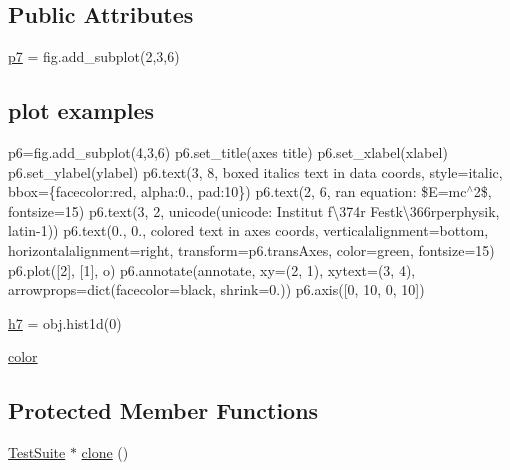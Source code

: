 \subsection*{Public Attributes}
\begin{DoxyCompactItemize}
\item 
\hyperlink{classTestSuite_a33f823770703efeb508f2736f4ef4e1b}{p7} = fig.\+add\+\_\+subplot(2,3,6)
\begin{DoxyCompactList}\small\item\em \subsection*{plot examples}

p6=fig.\+add\+\_\+subplot(4,3,6) p6.\+set\+\_\+title(\textquotesingle{}axes title\textquotesingle{}) p6.\+set\+\_\+xlabel(\textquotesingle{}xlabel\textquotesingle{}) p6.\+set\+\_\+ylabel(\textquotesingle{}ylabel\textquotesingle{}) p6.\+text(3, 8, \textquotesingle{}boxed italics text in data coords\textquotesingle{}, style=\textquotesingle{}italic\textquotesingle{}, bbox=\{\textquotesingle{}facecolor\textquotesingle{}\+:\textquotesingle{}red\textquotesingle{}, \textquotesingle{}alpha\textquotesingle{}\+:0., \textquotesingle{}pad\textquotesingle{}\+:10\}) p6.\+text(2, 6, r\textquotesingle{}an equation\+: \$E=mc$^\wedge$2\$\textquotesingle{}, fontsize=15) p6.\+text(3, 2, unicode(\textquotesingle{}unicode\+: Institut f\textbackslash{}374r Festk\textbackslash{}366rperphysik\textquotesingle{}, \textquotesingle{}latin-\/1\textquotesingle{})) p6.\+text(0., 0., \textquotesingle{}colored text in axes coords\textquotesingle{}, verticalalignment=\textquotesingle{}bottom\textquotesingle{}, horizontalalignment=\textquotesingle{}right\textquotesingle{}, transform=p6.\+trans\+Axes, color=\textquotesingle{}green\textquotesingle{}, fontsize=15) p6.\+plot(\mbox{[}2\mbox{]}, \mbox{[}1\mbox{]}, \textquotesingle{}o\textquotesingle{}) p6.\+annotate(\textquotesingle{}annotate\textquotesingle{}, xy=(2, 1), xytext=(3, 4), arrowprops=dict(facecolor=\textquotesingle{}black\textquotesingle{}, shrink=0.)) p6.\+axis(\mbox{[}0, 10, 0, 10\mbox{]}) \end{DoxyCompactList}\item 
\hyperlink{classTestSuite_a64192d2fc98e5040f3156e460d23d8ac}{h7} = obj.\+hist1d(0)
\item 
\hyperlink{classTestSuite_a3e108594545394553993c4e2c45d27de}{color}
\end{DoxyCompactItemize}
\subsection*{Protected Member Functions}
\begin{DoxyCompactItemize}
\item 
\hyperlink{classTestSuite_1_1TestSuite}{Test\+Suite} $\ast$ \hyperlink{classTestSuite_a949558c82561fd2b3548f0d050accab8}{clone} ()
\end{DoxyCompactItemize}
